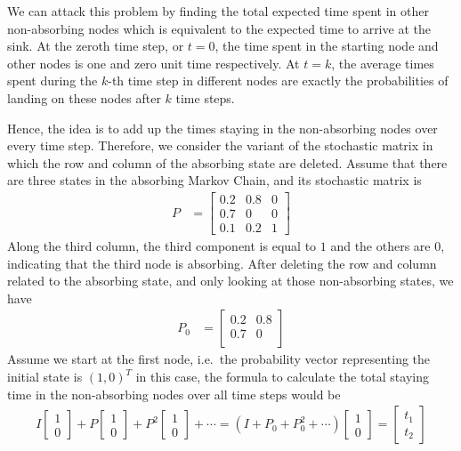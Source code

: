 We can attack this problem by finding the total expected time spent in other non-absorbing nodes which is equivalent to the expected time to arrive at the sink. At the zeroth time step, or $t=0$, the time spent in the starting node and other nodes is one and zero unit time respectively. At $t=k$, the average times spent during the $k$-th time step in different nodes are exactly the probabilities of landing on these nodes after $k$ time steps. \par
Hence, the idea is to add up the times staying in the non-absorbing nodes over every time step. Therefore, we consider the variant of the stochastic matrix in which the row and column of the absorbing state are deleted. Assume that there are three states in the absorbing Markov Chain, and its stochastic matrix is
\begin{align*}
P &= 
\begin{bmatrix}
0.2 & 0.8 & 0 \\
0.7 & 0 & 0 \\
0.1 & 0.2 & 1
\end{bmatrix}
\end{align*}
Along the third column, the third component is equal to $1$ and the others are $0$, indicating that the third node is absorbing. After deleting the row and column related to the absorbing state, and only looking at those non-absorbing states, we have
\begin{align*}
P_0 &= 
\begin{bmatrix}
0.2 & 0.8\\
0.7 & 0 \\
\end{bmatrix}   
\end{align*}
Assume we start at the first node, i.e.\ the probability vector representing the initial state is $(1, 0)^T$ in this case, the formula to calculate the total staying time in the non-absorbing nodes over all time steps would be
\begin{align*}
I
\begin{bmatrix}
1 \\
0
\end{bmatrix}
+
P
\begin{bmatrix}
1 \\
0
\end{bmatrix}
+
P^2
\begin{bmatrix}
1 \\
0
\end{bmatrix}
+ \cdots 
=
(I + P_0 + P_0^2 + \cdots)
\begin{bmatrix}
1 \\
0
\end{bmatrix}
=
\begin{bmatrix}
t_1 \\
t_2
\end{bmatrix}
\end{align*}
